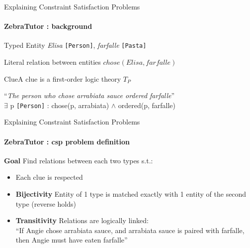 \documentclass{beamer}
\newcommand\m[1]{\ensuremath{#1}\xspace}
\newcommand\allconstraints{\m{T_P}}
\begin{document}
\begin{frame}{\small{Explaining Constraint Satisfaction Problems}}
    \framesubtitle{ZebraTutor : background}
    \begin{block}{Typed Entity} \textit{Elisa} \texttt{[Person]}, \textit{farfalle} \texttt{[Pasta]}\end{block}
    \vspace{0.5em}
    \begin{block}{Literal} relation between entities $chose(Elisa, farfalle)$\end{block}
    \vspace{0.5em}
    \begin{block}{Clue}A clue is a first-order logic theory $\allconstraints$
        \begin{center}
            ``\emph{The person who chose arrabiata sauce ordered farfalle}''\\
            \vspace{0.5em}
            $\exists$ p \texttt{[Person]} : chose(p, arrabiata) $\wedge$ ordered(p, farfalle)
        \end{center}
    \end{block}

\end{frame}

\begin{frame}{\small{Explaining Constraint Satisfaction Problems}}
    \framesubtitle{ZebraTutor : csp problem definition}
    \vfill
    \textbf{Goal} Find relations between each two types s.t.:
    {\small
    \begin{itemize}
        \item Each clue is respected
        \item \textbf{Bijectivity} Entity of 1 type is matched exactly with 1 entity of the second type (reverse holds)
        \item \textbf{Transitivity} Relations are logically linked:\\
              ``If Angie chose arrabiata sauce, and arrabiata sauce is paired with farfalle, then Angie must have eaten farfalle''
    \end{itemize}
    }

\end{frame}
\end{document}
